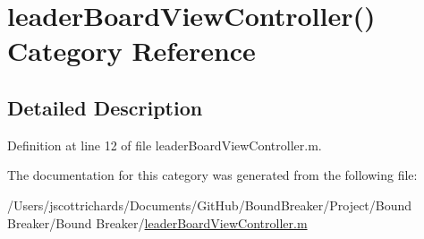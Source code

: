 \hypertarget{categoryleader_board_view_controller_07_08}{}\section{leader\+Board\+View\+Controller() Category Reference}
\label{categoryleader_board_view_controller_07_08}


\subsection{Detailed Description}


Definition at line 12 of file leader\+Board\+View\+Controller.\+m.



The documentation for this category was generated from the following file\+:\begin{DoxyCompactItemize}
\item 
/\+Users/jscottrichards/\+Documents/\+Git\+Hub/\+Bound\+Breaker/\+Project/\+Bound Breaker/\+Bound Breaker/\hyperlink{leader_board_view_controller_8m}{leader\+Board\+View\+Controller.\+m}\end{DoxyCompactItemize}
